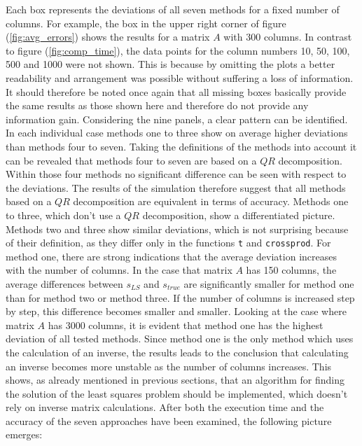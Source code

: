 Each box represents the deviations of all seven methods for a fixed number of columns. For example, the box in the upper right corner of figure (\ref{fig:avg_errors}) shows the results for a matrix $A$ with 300 columns. In contrast to figure (\ref{fig:comp_time}), the data points for the column numbers 10, 50, 100, 500 and 1000 were not shown. This is because by omitting the plots a better readability and arrangement was possible without suffering a loss of information. It should therefore be noted once again that all missing boxes basically provide the same results as those shown here and therefore do not provide any information gain. Considering the nine panels, a clear pattern can be identified. In each individual case  methods one to three show on average higher deviations than methods four to seven. Taking the definitions of the methods into account it can be revealed that methods four to seven are based on a $QR$ decomposition. Within those four methods no significant difference can be seen with respect to the deviations. The results of the simulation therefore suggest that all methods based on a $QR$ decomposition are equivalent in terms of accuracy. Methods one to three, which don't use a $QR$ decomposition, show a differentiated picture. Methods two and three show similar deviations, which is not surprising because of their definition, as they differ only in the functions \texttt{t} and \texttt{crossprod}. For method one, there are strong indications that the average deviation increases with the number of columns. In the case that matrix $A$ has 150 columns, the average differences between $s_{LS}$ and $s_{true}$ are significantly smaller for method one than for method two or method three. If the number of columns is increased step by step, this difference becomes smaller and smaller. Looking at the case where matrix $A$ has 3000 columns, it is evident that method one has the highest deviation of all tested methods. Since method one is the only method which uses the calculation of an inverse, the results leads to the conclusion that calculating an inverse becomes more unstable as the number of columns increases. This shows, as already mentioned in previous sections, that an algorithm for finding the solution of the least squares problem should be implemented, which doesn't rely on inverse matrix calculations. After both the execution time and the accuracy of the seven approaches have been examined, the following picture emerges:

